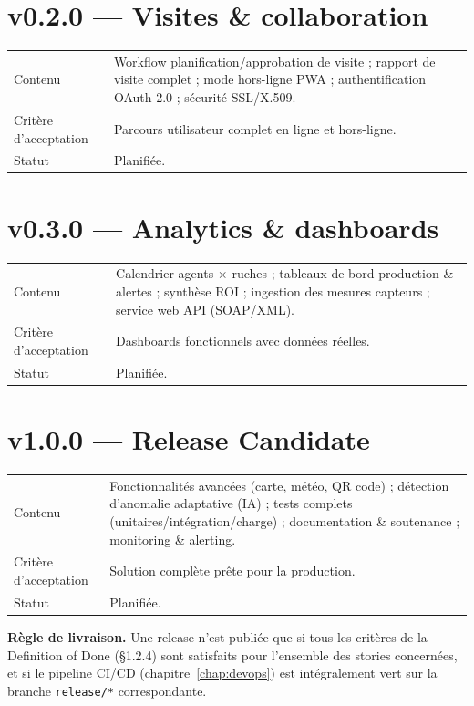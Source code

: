 \section{v0.2.0 --- Visites \& collaboration}

\begin{center}
\begin{tabular}{lp{11cm}}
\toprule
Contenu &
  Workflow planification/approbation de visite ;
  rapport de visite complet ;
  mode hors-ligne PWA ;
  authentification OAuth 2.0 ;
  sécurité SSL/X.509. \\
Critère d'acceptation & Parcours utilisateur complet en ligne et hors-ligne. \\
Statut & Planifiée. \\
\bottomrule
\end{tabular}
\end{center}

\section{v0.3.0 --- Analytics \& dashboards}

\begin{center}
\begin{tabular}{lp{11cm}}
\toprule
Contenu &
  Calendrier agents $\times$ ruches ;
  tableaux de bord production \& alertes ;
  synthèse ROI ;
  ingestion des mesures capteurs ;
  service web API (SOAP/XML). \\
Critère d'acceptation & Dashboards fonctionnels avec données réelles. \\
Statut & Planifiée. \\
\bottomrule
\end{tabular}
\end{center}

\section{v1.0.0 --- Release Candidate}

\begin{center}
\begin{tabular}{lp{11cm}}
\toprule
Contenu &
  Fonctionnalités avancées (carte, météo, QR code) ;
  détection d'anomalie adaptative (IA) ;
  tests complets (unitaires/intégration/charge) ;
  documentation \& soutenance ;
  monitoring \& alerting. \\
Critère d'acceptation & Solution complète prête pour la production. \\
Statut & Planifiée. \\
\bottomrule
\end{tabular}
\end{center}

\begin{encadre}
\textbf{Règle de livraison.} Une release n'est publiée que si tous les
critères de la Definition of Done (\S1.2.4) sont satisfaits pour l'ensemble
des stories concernées, et si le pipeline CI/CD (chapitre~\ref{chap:devops})
est intégralement vert sur la branche \texttt{release/*} correspondante.
\end{encadre}
